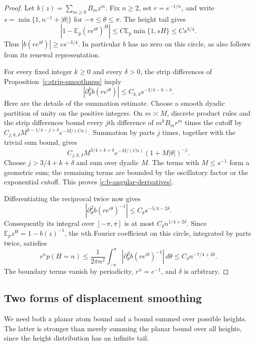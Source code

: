 \begin{proof}
Let $b(z)=\sum_{m\ge0}B_mz^m$.  Fix $n\ge2$, set
$r=e^{-1/n}$, and write $s=\min\{1,n^{-1}+|\theta|\}$ for
$-\pi\le\theta\le\pi$.  The height tail gives
\[
 |1-\mathbb E_p(re^{i\theta})^H|
 \le C\mathbb E_p\min\{1,sH\}\le Cs^{3/4}.
\]
Thus $|b(re^{i\theta})|\ge cs^{-3/4}$.  In particular $b$ has no
zero on this circle, as also follows from its renewal representation.

For every fixed integer $k\ge0$ and every $\delta>0$, the strip
differences of Proposition~\ref{c:strip-smoothness} imply
\begin{equation}\label{c:b-angular-derivatives}
 \left|\partial_\theta^k b(re^{i\theta})\right|
 \le C_{k,\delta}s^{-3/4-k-\delta}.
\end{equation}
Here are the details of the summation estimate.  Choose a smooth dyadic
partition of unity on the positive integers.  On $m\asymp M$, discrete
product rules and the strip differences bound every $j$th difference of
$m^kB_mr^m$ times the cutoff by
$C_{j,k,\delta}M^{k-1/4-j+\delta}e^{-M/(Cn)}$.
Summation by parts $j$ times, together with the trivial sum bound, gives
\[
 C_{j,k,\delta}M^{3/4+k+\delta}
 e^{-M/(Cn)}(1+M|\theta|)^{-j}.
\]
Choose $j>3/4+k+\delta$ and sum over dyadic $M$.  The terms with
$M\le s^{-1}$ form a geometric sum; the remaining terms are bounded by
the oscillatory factor or the exponential cutoff.  This proves
\eqref{c:b-angular-derivatives}.

Differentiating the reciprocal twice now gives
\[
 \left|\partial_\theta^2 b(re^{i\theta})^{-1}\right|
 \le C_\delta s^{-5/4-2\delta}.
\]
Consequently its integral over $[-\pi,\pi]$ is at most
$C_\delta n^{1/4+2\delta}$.  Since
$\mathbb E_pz^H=1-b(z)^{-1}$, the $n$th Fourier coefficient on this
circle, integrated by parts twice, satisfies
\[
 r^n p(H=n)
 \le\frac1{2\pi n^2}
 \int_{-\pi}^{\pi}\left|
 \partial_\theta^2 b(re^{i\theta})^{-1}\right|\,d\theta
 \le C_\delta n^{-7/4+2\delta}.
\]
The boundary terms vanish by periodicity, $r^n=e^{-1}$, and $\delta$
is arbitrary.
\end{proof}

\subsection{Two forms of displacement smoothing}

We need both a planar atom bound and a bound summed over possible heights.
The latter is stronger than merely summing the planar bound over all
heights, since the height distribution has an infinite tail.

